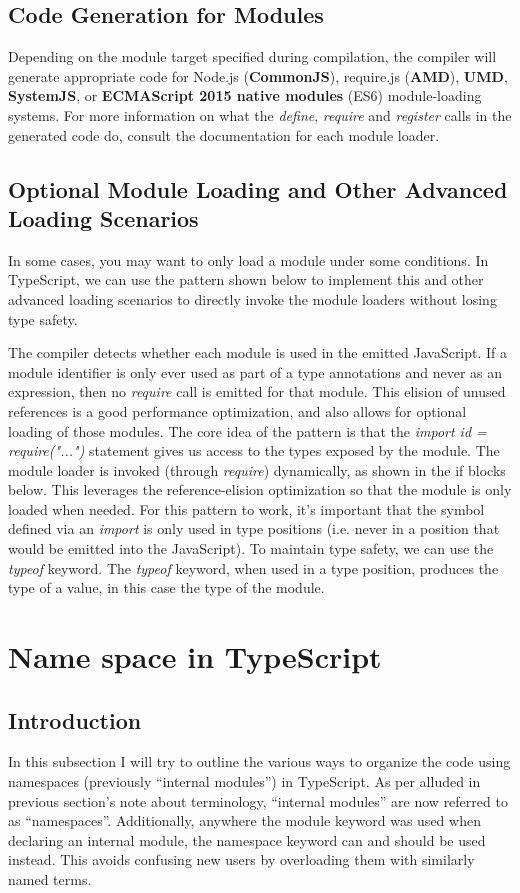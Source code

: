 \documentclass[a4paper]{report}
\begin{document}
\subsection{Code Generation for Modules}
Depending on the module target specified during compilation, the compiler will generate appropriate code for Node.js (\textbf{CommonJS}), require.js (\textbf{AMD}), \textbf{UMD}, \textbf{SystemJS}, or \textbf{ECMAScript 2015 native modules} (ES6) module-loading systems. For more information on what the \emph{define}, \emph{require} and \emph{register} calls in the generated code do, consult the documentation for each module loader.

\subsection{Optional Module Loading and Other Advanced Loading Scenarios}
In some cases, you may want to only load a module under some conditions. In TypeScript, we can use the pattern shown below to implement this and other advanced loading scenarios to directly invoke the module loaders without losing type safety.
\par
The compiler detects whether each module is used in the emitted JavaScript. If a module identifier is only ever used as part of a type annotations and never as an expression, then no \emph{require} call is emitted for that module. This elision of unused references is a good performance optimization, and also allows for optional loading of those modules.
The core idea of the pattern is that the \emph{import id = require("...")} statement gives us access to the types exposed by the module. The module loader is invoked (through \emph{require}) dynamically, as shown in the if blocks below. This leverages the reference-elision optimization so that the module is only loaded when needed. For this pattern to work, it’s important that the symbol defined via an \emph{import} is only used in type positions (i.e. never in a position that would be emitted into the JavaScript).
To maintain type safety, we can use the \emph{typeof} keyword. The \emph{typeof} keyword, when used in a type position, produces the type of a value, in this case the type of the module.

\section{Name space in TypeScript}
\subsection{Introduction}
In this subsection I will try to outline the various ways to organize the code using namespaces (previously “internal modules”) in TypeScript. As per alluded in previous section's note about terminology, ``internal modules'' are now referred to as “namespaces”. Additionally, anywhere the module keyword was used when declaring an internal module, the namespace keyword can and should be used instead. This avoids confusing new users by overloading them with similarly named terms.
\end{document}
